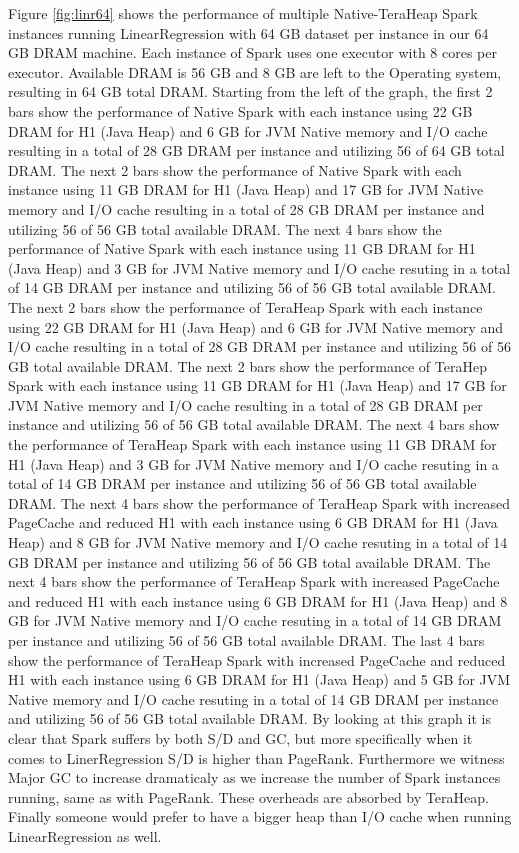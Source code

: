 Figure \ref{fig:linr64} shows the performance of multiple
Native-TeraHeap Spark instances running LinearRegression with 64 GB
dataset per instance in our 64 GB DRAM machine. Each instance of Spark
uses one executor with 8 cores per executor. Available DRAM is 56 GB
and 8 GB are left to the Operating system, resulting in 64 GB total
DRAM. Starting from the left of the graph, the first 2 bars show the
performance of Native Spark with each instance using 22 GB DRAM for H1
(Java Heap) and 6 GB for JVM Native memory and I/O cache resulting in
a total of 28 GB DRAM per instance and utilizing 56 of 64 GB total
DRAM. The next 2 bars show the performance of Native Spark with each
instance using 11 GB DRAM for H1 (Java Heap) and 17 GB for JVM Native
memory and I/O cache resulting in a total of 28 GB DRAM per instance
and utilizing 56 of 56 GB total available DRAM. The next 4 bars show
the performance of Native Spark with each instance using 11 GB DRAM
for H1 (Java Heap) and 3 GB for JVM Native memory and I/O cache
resuting in a total of 14 GB DRAM per instance and utilizing 56 of 56
GB total available DRAM. The next 2 bars show the performance of
TeraHeap Spark with each instance using 22 GB DRAM for H1 (Java Heap)
and 6 GB for JVM Native memory and I/O cache resulting in a total of
28 GB DRAM per instance and utilizing 56 of 56 GB total available
DRAM. The next 2 bars show the performance of TeraHep Spark with each
instance using 11 GB DRAM for H1 (Java Heap) and 17 GB for JVM Native
memory and I/O cache resulting in a total of 28 GB DRAM per instance
and utilizing 56 of 56 GB total available DRAM. The next 4 bars show
the performance of TeraHeap Spark with each instance using 11 GB DRAM
for H1 (Java Heap) and 3 GB for JVM Native memory and I/O cache
resuting in a total of 14 GB DRAM per instance and utilizing 56 of 56
GB total available DRAM. The next 4 bars show the performance of
TeraHeap Spark with increased PageCache and reduced H1 with each
instance using 6 GB DRAM for H1 (Java Heap) and 8 GB for JVM Native
memory and I/O cache resuting in a total of 14 GB DRAM per instance
and utilizing 56 of 56 GB total available DRAM. The next 4 bars show
the performance of TeraHeap Spark with increased PageCache and reduced
H1 with each instance using 6 GB DRAM for H1 (Java Heap) and 8 GB for
JVM Native memory and I/O cache resuting in a total of 14 GB DRAM per
instance and utilizing 56 of 56 GB total available DRAM. The last 4
bars show the performance of TeraHeap Spark with increased PageCache
and reduced H1 with each instance using 6 GB DRAM for H1 (Java Heap)
and 5 GB for JVM Native memory and I/O cache resuting in a total of 14
GB DRAM per instance and utilizing 56 of 56 GB total available DRAM.
By looking at this graph it is clear that Spark suffers by both S/D
and GC, but more specifically when it comes to LinerRegression S/D is
higher than PageRank. Furthermore we witness Major GC to increase
dramaticaly as we increase the number of Spark instances running, same
as with PageRank. These overheads are absorbed by TeraHeap. Finally
someone would prefer to have a bigger heap than I/O cache when running
LinearRegression as well.

